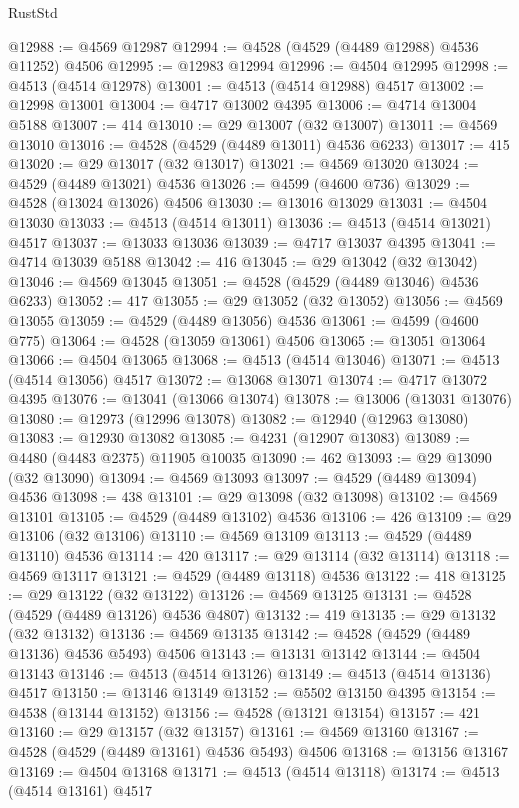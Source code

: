 \begin{lexlean}{RustStd}
\begin{coremodule}
@12988 := @4569 @12987
@12994 := @4528 (@4529 (@4489 @12988) @4536 @11252) @4506
@12995 := @12983 @12994
@12996 := @4504 @12995
@12998 := @4513 (@4514 @12978)
@13001 := @4513 (@4514 @12988) @4517
@13002 := @12998 @13001
@13004 := @4717 @13002 @4395
@13006 := @4714 @13004 @5188
@13007 := 414
@13010 := @29 @13007 (@32 @13007)
@13011 := @4569 @13010
@13016 := @4528 (@4529 (@4489 @13011) @4536 @6233)
@13017 := 415
@13020 := @29 @13017 (@32 @13017)
@13021 := @4569 @13020
@13024 := @4529 (@4489 @13021) @4536
@13026 := @4599 (@4600 @736)
@13029 := @4528 (@13024 @13026) @4506
@13030 := @13016 @13029
@13031 := @4504 @13030
@13033 := @4513 (@4514 @13011)
@13036 := @4513 (@4514 @13021) @4517
@13037 := @13033 @13036
@13039 := @4717 @13037 @4395
@13041 := @4714 @13039 @5188
@13042 := 416
@13045 := @29 @13042 (@32 @13042)
@13046 := @4569 @13045
@13051 := @4528 (@4529 (@4489 @13046) @4536 @6233)
@13052 := 417
@13055 := @29 @13052 (@32 @13052)
@13056 := @4569 @13055
@13059 := @4529 (@4489 @13056) @4536
@13061 := @4599 (@4600 @775)
@13064 := @4528 (@13059 @13061) @4506
@13065 := @13051 @13064
@13066 := @4504 @13065
@13068 := @4513 (@4514 @13046)
@13071 := @4513 (@4514 @13056) @4517
@13072 := @13068 @13071
@13074 := @4717 @13072 @4395
@13076 := @13041 (@13066 @13074)
@13078 := @13006 (@13031 @13076)
@13080 := @12973 (@12996 @13078)
@13082 := @12940 (@12963 @13080)
@13083 := @12930 @13082
@13085 := @4231 (@12907 @13083)
@13089 := @4480 (@4483 @2375) @11905 @10035
@13090 := 462
@13093 := @29 @13090 (@32 @13090)
@13094 := @4569 @13093
@13097 := @4529 (@4489 @13094) @4536
@13098 := 438
@13101 := @29 @13098 (@32 @13098)
@13102 := @4569 @13101
@13105 := @4529 (@4489 @13102) @4536
@13106 := 426
@13109 := @29 @13106 (@32 @13106)
@13110 := @4569 @13109
@13113 := @4529 (@4489 @13110) @4536
@13114 := 420
@13117 := @29 @13114 (@32 @13114)
@13118 := @4569 @13117
@13121 := @4529 (@4489 @13118) @4536
@13122 := 418
@13125 := @29 @13122 (@32 @13122)
@13126 := @4569 @13125
@13131 := @4528 (@4529 (@4489 @13126) @4536 @4807)
@13132 := 419
@13135 := @29 @13132 (@32 @13132)
@13136 := @4569 @13135
@13142 := @4528 (@4529 (@4489 @13136) @4536 @5493) @4506
@13143 := @13131 @13142
@13144 := @4504 @13143
@13146 := @4513 (@4514 @13126)
@13149 := @4513 (@4514 @13136) @4517
@13150 := @13146 @13149
@13152 := @5502 @13150 @4395
@13154 := @4538 (@13144 @13152)
@13156 := @4528 (@13121 @13154)
@13157 := 421
@13160 := @29 @13157 (@32 @13157)
@13161 := @4569 @13160
@13167 := @4528 (@4529 (@4489 @13161) @4536 @5493) @4506
@13168 := @13156 @13167
@13169 := @4504 @13168
@13171 := @4513 (@4514 @13118)
@13174 := @4513 (@4514 @13161) @4517

\end{coremodule}
\end{lexlean}
